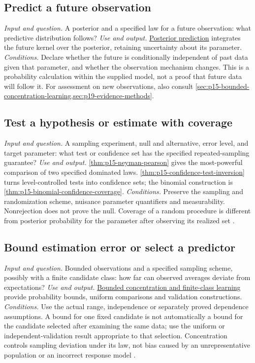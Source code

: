 \subsection{Predict a future observation}
\label{sec:p14-finder-prediction}
\textit{Input and question.} A posterior and a specified law for a future
observation: what predictive distribution follows?
\textit{Use and output.}
\hyperref[sec:p15-bayes-prediction]{Posterior prediction} integrates the future
kernel over the posterior, retaining uncertainty about its parameter.
\textit{Conditions.} Declare whether the future is conditionally independent
of past data given that parameter, and whether the observation mechanism
changes. This is a probability calculation within the supplied model, not a
proof that future data will follow it. For assessment on new observations,
also consult \cref{sec:p15-bounded-concentration-learning,sec:p19-evidence-methods}.

\subsection{Test a hypothesis or estimate with coverage}
\label{sec:p14-finder-testing}
\textit{Input and question.} A sampling experiment, null and alternative,
error level, and target parameter: what test or confidence set has the
specified repeated-sampling guarantee?
\textit{Use and output.}
\cref{thm:p15-neyman-pearson} gives the most-powerful comparison of two
specified dominated laws.
\cref{thm:p15-confidence-test-inversion} turns level-controlled tests into
confidence sets; the binomial construction is
\cref{thm:p15-binomial-confidence-coverage}.
\textit{Conditions.} Preserve the sampling and randomization scheme, nuisance
parameter quantifiers and measurability. Nonrejection does not prove the null.
Coverage of a random procedure is different from posterior probability for
the parameter after observing its realized set
\cite{NeymanPearson1933Tests,Neyman1937Confidence}.

\subsection{Bound estimation error or select a predictor}
\label{sec:p14-finder-learning}
\textit{Input and question.} Bounded observations and a specified sampling
scheme, possibly with a finite candidate class: how far can observed averages
deviate from expectations?
\textit{Use and output.}
\hyperref[sec:p15-bounded-concentration-learning]{Bounded concentration and
finite-class learning} provide probability bounds, uniform comparisons and
validation constructions.
\textit{Conditions.} Use the actual range, independence or separately proved
dependence assumptions. A bound for one fixed candidate is not automatically
a bound for the candidate selected after examining the same data; use the
uniform or independent-validation result appropriate to that selection.
Concentration controls sampling deviation under its law, not bias caused by
an unrepresentative population or an incorrect response model
\cite{Hoeffding1963BoundedSums}.

